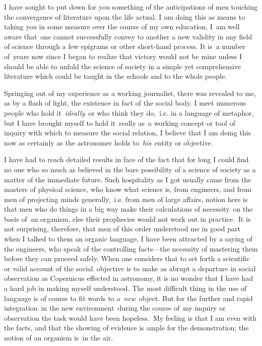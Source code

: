\documentclass[twoside,symmetric,nobib,justified]{tufte-book}
\begin{document}
I have sought to put down for you something of the anticipations of men
touching the convergence of literature upon the life actual. I am doing
this as means to taking you in some measure over the course of my own
education, I~am well aware that~one cannot successfully convey to
another a new validity in any field of science through a few epigrams or
other short-hand process. It is~a number of~years now since I began to
realize that victory would not be mine unless I should be able to unfold
the science of society in a simple yet comprehensive literature which
could be taught in the schools and to the whole people.~

Springing out of my experience as a working journalist, there was
revealed to me, as by a flash of light, the existence in fact of the
social body. I meet numerous people who hold it~\emph{ideally}~or who
think they do,~i.e. in a language of metaphor, but I have brought myself
to hold it~really as~a working concept or tool of inquiry with which to
measure the social relation, I believe that I am doing this now as
certainly as the astronomer holds to~\emph{his}~entity or objective.~

I have had to reach detailed results in face of the fact that for long I
could find no one who so much as believed in the bare possibility of a
science of society as a matter of the immediate future. Such hospitality
as I got usually came from the masters of physical science, who know
what science is, from engineers, and from men of projecting minds
generally,~i.e. from men of large affairs, notion here is that men who
do things in a big way make their calculations of necessity~on the basis
of~an organism, else their prophecies would not work out in practice.~It
is not surprising, therefore, that men of this order understood me in
good part when I talked to them an organic language, I have been
attracted by a saying of the engineers, who speak of the controlling
facts---the necessity of mastering them before they can proceed safely.
When one considers that to set forth a scientific or valid account of
the social~objective is to make as abrupt a departure in social
observation as Copernicus effected in astronomy, it is no wonder that I
have had a hard job in making myself understood. The most difficult
thing in the use of language is of course to fit words to
a~\emph{new}~object. But for the further and rapid integration~in the
new environment~during the course of~my inquiry or observation the task
would have been hopeless.~My feeling is that I am even with the facts,
and that the showing of evidence is ample for the demonstration; the
notion of an organism is~in the air.~
\end{document}
